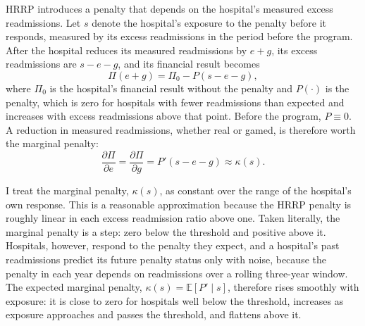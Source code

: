 \documentclass[12pt]{article}
\theoremstyle{definition}   %
\begin{document}
    HRRP introduces a penalty that depends on the hospital's measured excess readmissions. Let $s$ denote the hospital's exposure to the penalty before it responds, measured by its excess readmissions in the period before the program. After the hospital reduces its measured readmissions by $e + g$, its excess readmissions are $s - e - g$, and its financial result becomes
    \begin{equation}\label{eq:profit_hrrp}
        \Pi(e + g) = \Pi_0 - P(s - e - g),
    \end{equation}
    where $\Pi_0$ is the hospital's financial result without the penalty and $P(\cdot)$ is the penalty, which is zero for hospitals with fewer readmissions than expected and increases with excess readmissions above that point. Before the program, $P \equiv 0$. A reduction in measured readmissions, whether real or gamed, is therefore worth the marginal penalty:
    \begin{equation}\label{eq:kappa}
        \frac{\partial \Pi}{\partial e} = \frac{\partial \Pi}{\partial g} = P'(s - e - g) \approx \kappa(s).
    \end{equation}

    I treat the marginal penalty, $\kappa(s)$, as constant over the range of the hospital's own response. This is a reasonable approximation because the HRRP penalty is roughly linear in each excess readmission ratio above one. Taken literally, the marginal penalty is a step: zero below the threshold and positive above it. Hospitals, however, respond to the penalty they expect, and a hospital's past readmissions predict its future penalty status only with noise, because the penalty in each year depends on readmissions over a rolling three-year window. The expected marginal penalty, $\kappa(s) = \mathbb{E}[P'\mid s]$, therefore rises smoothly with exposure: it is close to zero for hospitals well below the threshold, increases as exposure approaches and passes the threshold, and flattens above it. 
\end{document}

